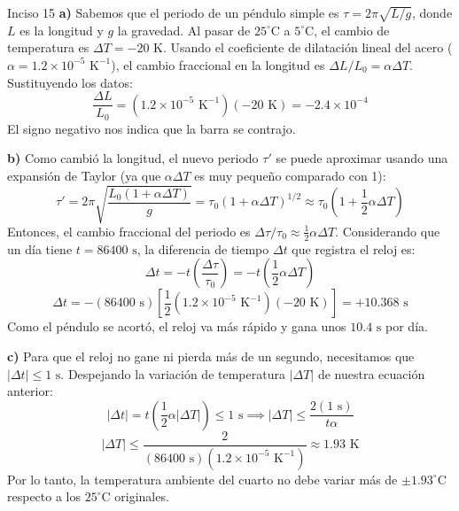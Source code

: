 \documentclass[11pt,letterpaper]{article}
\begin{document}
\begin{inciso}{Inciso 15}
\textbf{a)} Sabemos que el periodo de un péndulo simple es $\tau = 2\pi\sqrt{L/g}$, donde $L$ es la longitud y $g$ la gravedad. Al pasar de $25^{\circ}\text{C}$ a $5^{\circ}\text{C}$, el cambio de temperatura es $\Delta T = -20\text{ K}$. Usando el coeficiente de dilatación lineal del acero ($\alpha = 1.2 \times 10^{-5}\text{ K}^{-1}$), el cambio fraccional en la longitud es $\Delta L / L_{0} = \alpha \Delta T$. Sustituyendo los datos:
$$ \frac{\Delta L}{L_{0}} = (1.2 \times 10^{-5}\text{ K}^{-1})(-20\text{ K}) = -2.4 \times 10^{-4} $$
El signo negativo nos indica que la barra se contrajo. 

\vspace{0.3cm}
\noindent\textbf{b)} Como cambió la longitud, el nuevo periodo $\tau'$ se puede aproximar usando una expansión de Taylor (ya que $\alpha \Delta T$ es muy pequeño comparado con 1):
$$ \tau' = 2\pi\sqrt{\frac{L_{0}(1 + \alpha \Delta T)}{g}} = \tau_{0} (1 + \alpha \Delta T)^{1/2} \approx \tau_{0} \left( 1 + \frac{1}{2}\alpha \Delta T \right) $$
Entonces, el cambio fraccional del periodo es $\Delta \tau / \tau_{0} \approx \frac{1}{2}\alpha \Delta T$. Considerando que un día tiene $t = 86400\text{ s}$, la diferencia de tiempo $\Delta t$ que registra el reloj es:
$$ \Delta t = -t \left( \frac{\Delta \tau}{\tau_{0}} \right) = -t \left( \frac{1}{2}\alpha \Delta T \right) $$
$$ \Delta t = -(86400\text{ s}) \left[ \frac{1}{2} (1.2 \times 10^{-5}\text{ K}^{-1}) (-20\text{ K}) \right] = +10.368\text{ s} $$
Como el péndulo se acortó, el reloj va más rápido y gana unos $10.4\text{ s}$ por día. 

\vspace{0.3cm}
\noindent\textbf{c)} Para que el reloj no gane ni pierda más de un segundo, necesitamos que $|\Delta t| \le 1\text{ s}$. Despejando la variación de temperatura $|\Delta T|$ de nuestra ecuación anterior:
$$ |\Delta t| = t \left( \frac{1}{2}\alpha |\Delta T| \right) \le 1\text{ s} \implies |\Delta T| \le \frac{2(1\text{ s})}{t \alpha} $$
$$ |\Delta T| \le \frac{2}{(86400\text{ s}) (1.2 \times 10^{-5}\text{ K}^{-1})} \approx 1.93\text{ K} $$
Por lo tanto, la temperatura ambiente del cuarto no debe variar más de $\pm 1.93^{\circ}\text{C}$ respecto a los $25^{\circ}\text{C}$ originales.
\end{inciso}
\end{document}
